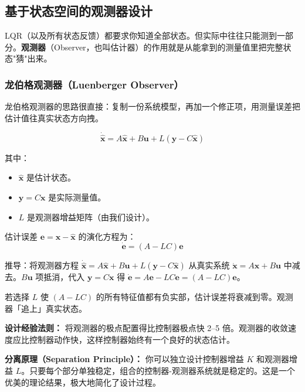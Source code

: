\subsection{基于状态空间的观测器设计}

LQR（以及所有状态反馈）都要求你知道全部状态。但实际中往往只能测到一部分。\textbf{观测器}（Observer，也叫估计器）的作用就是从能拿到的测量值里把完整状态"猜"出来。

\subsubsection{龙伯格观测器（Luenberger Observer）}

龙伯格观测器的思路很直接：复制一份系统模型，再加一个修正项，用测量误差把估计值往真实状态方向拽。

\begin{equation}
\dot{\hat{\mathbf{x}}} = A\hat{\mathbf{x}} + B\mathbf{u} + L(\mathbf{y} - C\hat{\mathbf{x}})
\end{equation}

其中：
\begin{itemize}[nosep]
    \item $\hat{\mathbf{x}}$ 是估计状态。
    \item $\mathbf{y} = C\mathbf{x}$ 是实际测量值。
    \item $L$ 是观测器增益矩阵（由我们设计）。
\end{itemize}

估计误差 $\mathbf{e} = \mathbf{x} - \hat{\mathbf{x}}$ 的演化方程为：
\begin{equation}
\dot{\mathbf{e}} = (A - LC)\mathbf{e}
\end{equation}

推导：将观测器方程 $\dot{\hat{\mathbf{x}}} = A\hat{\mathbf{x}} + B\mathbf{u} + L(\mathbf{y} - C\hat{\mathbf{x}})$ 从真实系统 $\dot{\mathbf{x}} = A\mathbf{x} + B\mathbf{u}$ 中减去。$B\mathbf{u}$ 项抵消，代入 $\mathbf{y} = C\mathbf{x}$ 得 $\dot{\mathbf{e}} = A\mathbf{e} - LC\mathbf{e} = (A - LC)\mathbf{e}$。

若选择 $L$ 使 $(A - LC)$ 的所有特征值都有负实部，估计误差将衰减到零。观测器「追上」真实状态。

\textbf{设计经验法则：} 将观测器的极点配置得比控制器极点快 2--5 倍。观测器的收敛速度应比控制器动作快，这样控制器始终有一个良好的状态估计。

\textbf{分离原理（Separation Principle）：} 你可以独立设计控制器增益 $K$ 和观测器增益 $L$。只要每个部分单独稳定，组合的控制器-观测器系统就是稳定的。这是一个优美的理论结果，极大地简化了设计过程。

